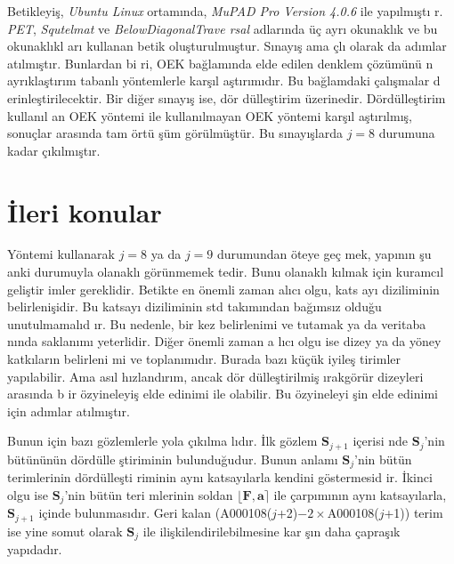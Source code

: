 \documentclass[a4paper,10pt]{article}
\begin{document}
Be\-tik\-le\-yi\c{s}, \textit{U\-bun\-tu Li\-nux} or\-tam\i nda, %
\textit{MuPAD Pro Version 4.0.6} ile ya\-p\i l\-m{\i}\c{s}\-t{\i}%
r. \textit{PET}, \textit{Squtelmat} ve \textit{BelowDiagonalTrave%
rsal} adlar\i nda \"u\c{c} ayr{\i} okunakl\i k ve bu okunakl\i kl%
ar{\i} kullanan betik olu\c{s}turulmu\c{s}tur. S\i nay\i\c{s} ama%
\c{c}l{\i} olarak da ad\i mlar at\i lm\i \c{s}t\i r. Bunlardan bi%
ri, OEK ba\u{g}lam\i nda elde edilen denklem \c{c}\"oz\"um\"un\"u%
n ayr\i kla\c{s}t\i r\i m tabanl{\i} y\"ontemlerle kar\-\c{s}\i l%
a\c{s}t\i r\i m\i d\i r. Bu ba\u{g}lamdaki \c{c}al\i \c{s}malar d%
erinle\c{s}tirilecektir. Bir di\u{g}er s\i nay\i \c{s} ise, d\"or%
d\"ulle\c{s}tirim \"uzerinedir. D\"ord\"ulle\c{s}tirim kullan\i l%
an OEK y\"ontemi ile kullan\i lmayan OEK y\"ontemi kar\-\c{s}\i l%
a\c{s}t\i r\i lm\i \c{s}, sonu\c{c}lar aras{\i}n\-da tam \"ort\"u%
\c{s}\"um g\"or\"ulm\"u\c{s}t\"ur. Bu s\i nay\i \c{s}larda $j=8$ %
durumuna kadar \c{c}\i k\i lm\i \c{s}t\i r. %

\section{\.Ileri konular}

Y\"ontemi kullanarak $j=8$ ya da $j=9$ durumundan \"oteye ge\c{c}%
mek, yap\i n\i n \c{s}u anki durumuyla olanakl{\i} g\"or\"unmemek%
tedir. Bunu olanakl{\i} k\i lmak i\c{c}in kuramc\i l geli\c{s}tir%
imler gereklidir. Betikte en \"onemli zaman al\i c{\i} olgu, kats%
ay{\i} diziliminin belirleni\c{s}idir. Bu katsay{\i} diziliminin %
std tak{\i}m\i ndan ba\u{g}\i ms\i z oldu\u{g}u u\-nutulmamal\i d%
\i r. Bu nedenle, bir kez belir\-lenimi ve tutamak ya da veritaba%
n\i nda saklan\i m{\i} yeterlidir. Di\u{g}er \"o\-nem\-li zaman a%
l\i c{\i} olgu ise dizey ya da y\"oney katk\i lar\i n belirle\-ni%
mi ve toplan\i m\i d\i r. Burada baz{\i} k\"u\c{c}\"uk iyile\c{s}%
tirimler yap\i labilir. Ama as\i l h\i zland\i r\i m, ancak d\"or%
d\"ulle\c{s}tirilmi\c{s} \i rakg\"or\"ur dizeyleri a\-ras\i nda b%
ir \"ozyineleyi\c{s} elde edinimi ile olabilir. Bu \"oz\-yineleyi%
\c{s}in elde edinimi i\c{c}in ad\i mlar at\i lm\i \c{s}t\i r. %

Bunun i\c{c}in ba\-z{\i} g\"oz\-lem\-ler\-le yola \c{c}\i k\i lma%
l\i d{\i}r. \.Ilk g\"oz\-lem $\mathbf{S}_{j+1}$ i\-\c{c}e\-ri\-si%
nde $\mathbf{S}_{j}$'nin b\"u\-t\"u\-n\"u\-n\"un d\"or\-d\"ul\-le%
\c{s}\-ti\-ri\-mi\-nin bulun\-du\u{g}u\-dur. Bu\-nun an\-lam{\i} %
$\mathbf{S}_{j}$'nin b\"u\-t\"un terimlerinin d\"ord\"ulle\c{s}ti%
riminin ayn{\i} katsay{\i}larla ken\-di\-ni g\"os\-ter\-me\-si\-d%
ir. \.I\-kin\-ci ol\-gu ise $\mathbf{S}_{j}$'nin b\"u\-t\"un teri%
m\-le\-ri\-nin sol\-dan $\lfloor \mathbf{F} , \mathbf{a} \rceil$ %
ile \c{c}ar\-p{\i}m{\i}n{\i}n ay\-n{\i} kat\-sa\-y{\i}\-lar\-la, %
$\mathbf{S}_{j+1}$ i\c{c}inde bulunma\-s{\i}d{\i}r. Ge\-ri kalan %
(A000108($j$+2)$-2\times$A000108($j$+1)) te\-rim ise yine somut olarak %
$\mathbf{S}_{j}$ ile ili\c{s}kilendi\-ri\-le\-bil\-me\-si\-ne kar%
\c{s}\i n daha \c{c}apra\c{s}\i k yap\i dad\i r. %
\end{document}
